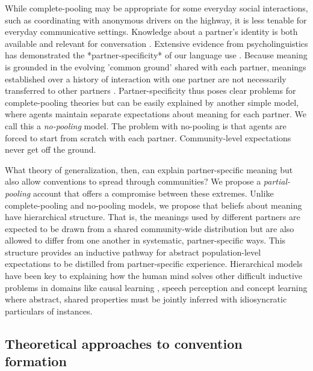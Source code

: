 While complete-pooling may be appropriate for some everyday social interactions, such as coordinating with anonymous drivers on the highway, it is less tenable for everyday communicative settings.
Knowledge about a partner's identity is both available and relevant for conversation \cite{eckert_three_2012, davidson_nice_1986}.
Extensive evidence from psycholinguistics has demonstrated the *partner-specificity* of our language use \cite{clark_using_1996}.
Because meaning is grounded in the evolving 'common ground' shared with each partner, meanings established over a history of interaction with one partner are not necessarily transferred to other partners \cite{wilkes-gibbs_coordinating_1992,metzing_when_2003}.
Partner-specificity thus poses clear problems for complete-pooling theories but can be easily explained by another simple model, where agents maintain separate expectations about meaning for each partner.
We call this a \emph{no-pooling} model.
The problem with no-pooling is that agents are forced to start from scratch with each partner.
Community-level expectations never get off the ground.

What theory of generalization, then, can explain partner-specific meaning but also allow conventions to spread through communities?
We propose a \emph{partial-pooling} account that offers a compromise between these extremes.
Unlike complete-pooling and no-pooling models, we propose that beliefs about meaning have hierarchical structure.
That is, the meanings used by different partners are expected to be drawn from a shared community-wide distribution but are also allowed to differ from one another in systematic, partner-specific ways.
This structure provides an inductive pathway for abstract population-level expectations to be distilled from partner-specific experience.
Hierarchical models have been key to explaining how the human mind solves other difficult inductive problems in domains like causal learning \cite{KempGoodmanTenenbaum10_LearningToLearn,GoodmanUllmanTenenbaum11_TheoryOfCausality}, speech perception \cite{KleinschmidtJaeger15_RobustSpeechPerception} and concept learning \cite{KempPerforsTenenbaum07_HBM, tenenbaum_how_2011} where abstract, shared properties must be jointly inferred with idiosyncratic particulars of instances.


\subsection{Theoretical approaches to convention formation}

%
%
%
%
%
